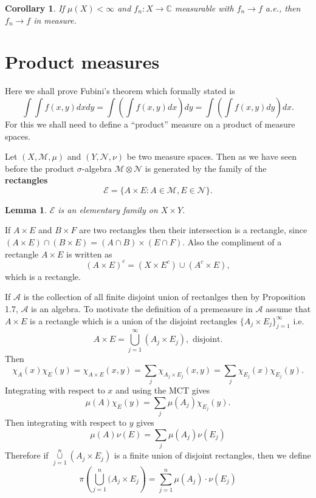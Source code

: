 \documentclass[12pt]{report}
\newtheorem{lemma}[theorem]{Lemma}
\newtheorem{corollary}[theorem]{Corollary}
\begin{document}
\begin{corollary}  If $\mu(X) <
\infty$ and $f_n: X \longrightarrow
\mathbb{C}$ measurable with $f_n \longrightarrow f$ a.e., then $f_n
\longrightarrow f$ in measure.
\end{corollary}


\section{Product measures}
 Here we shall prove Fubini's theorem which formally stated is
\[
\int \int f(x, y) dx dy = \int \left ( \int f(x, y) dx \right ) dy = \int
\left (
\int f(x, y) dy \right ) dx.
\] For this we shall need to define a ``product'' measure on a product  of
measure spaces.

Let $(X, \mathcal{M}, \mu)$ and $(Y, \mathcal{N}, \nu)$ be two measure
spaces.  Then as we have seen before the product $\sigma$-algebra
$\mathcal{M} \otimes \mathcal{N} $ is generated by the family of the
\textbf{rectangles}
\[
\mathcal{E} = \{A \times E: A \in \mathcal{M}, E \in \mathcal{N}\}.
\]

\begin{lemma}   $\mathcal{E}$ is an elementary family on $X \times Y$.
\end{lemma}

\medskip
{}  If $A \times E$ and $B \times F$ are two
rectangles then their intersection is a rectangle, since 
$(A \times E)
\cap (B \times E) = (A \cap B) \times (E \cap F).$  Also the compliment of
a rectangle $A
\times E$ is written as
\[(A \times E)^c = (X \times E^c) \cup (A^c \times E),
\] which is a rectangle.

\medskip
\noindent If $\mathcal{A}$ is the collection of all finite disjoint union of
rectanlges then by Proposition 1.7, $\mathcal{A}$ is an algebra.  To
motivate the definition of a premeasure in $\mathcal{A}$ assume that $A
\times E$ is a rectangle which is a union of the disjoint rectangles $\{A_j
\times E_j\}^\infty_{j=1}$ i.e.
\[ A \times E = \bigcup^\infty_{j=1} (A_j \times E_j), \mbox{ disjoint.}
\] Then
\[
\chi_A(x) \chi_E(y) = \chi_{A \times E} (x, y) = \sum_j \chi_{A_j \times
E_j} (x, y) = \sum_j \chi_{E_j} (x) \chi_{E_j} (y).
\] Integrating with respect to $x$ and using the MCT gives
\[
\mu(A) \chi_E(y) = \sum_j \mu(A_j) \chi_{E_j} (y).
\] Then integrating with respect to $y$ gives
\begin{equation*}
\mu(A) \nu(E) = \sum_j \mu(A_j) \nu(E_j)\tag{1}
\end{equation*} Therefore if $\overset{n}{\underset{j=1}{\cup}}   (A_j
\times E_j)$ is a finite union of disjoint rectangles, then we define
\begin{equation*}
\pi\left ( \bigcup^n_{j=1} (A_j \times E_j \right ) = \sum^n_{j=1}
\mu(A_j) \cdot \nu(E_j)\tag{2}
\end{equation*}
\end{document}
